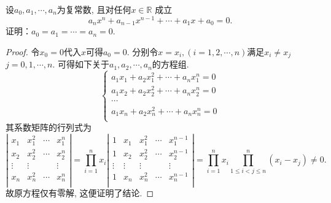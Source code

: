 \begin{quiza}
\woe 设\(a_0,a_1,\cdots,a_n\)为复常数, 且对任何\(x\in \mathbb{R}\) 成立 \[a_nx^n+a_{n-1}x^{n-1}+\cdots+a_1x+a_0=0.\]证明：\(a_0=a_1=\cdots=a_n=0\).
\begin{proof}
令\(x_0=0\)代入\(x\)可得\(a_0=0\). 分别令\(x=x_i,(i=1,2,\cdots,n)\)满足\(x_i\ne x_j\)\(j=0,1,\cdots,n\). 可得如下关于\(a_1,a_2,\cdots,a_n\)的方程组.
        \[\begin{cases}
            a_1x_1+a_2x_1^2+\cdots+a_nx^n_1=0\\
            a_1x_2+a_2x_2^2+\cdots+a_nx^n_2=0\\
            \cdots\\
            a_1x_n+a_2x_n^2+\cdots+a_nx^n_n=0\\
        \end{cases}\]
        其系数矩阵的行列式为
        \[\left|\begin{matrix}
            x_1&x_1^2&\cdots&x_1^n\\
            x_2&x_2^2&\cdots&x_2^n\\
            \vdots&\vdots&&\vdots\\
            x_n&x_n^2&\cdots&x_n^n\\
        \end{matrix}\right|=\prod_{i=1}^{n}x_i\left|\begin{matrix}
            1&x_1&x_1^2&\cdots&x_1^{n-1}\\
            1&x_2&x_2^2&\cdots&x_2^{n-1}\\
            \vdots&\vdots&\vdots&&\vdots\\
            1&x_n&x_n^2&\cdots&x_n^{n-1}\\
        \end{matrix}\right|=\prod_{i=1}^{n}x_i\prod_{1\leqslant i<j\leqslant n}^{n}(x_i-x_j)\ne 0.\]
        故原方程仅有零解, 这便证明了结论. \hfill\qedsymbol
        \tcbline
        

\end{proof}
\end{quiza}
